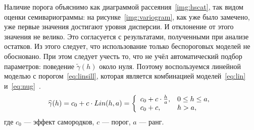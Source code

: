 Наличие порога объяснимо как диаграммой рассеяния~\ref{img:hscat}, так видом оценки семивариограммы: на рисунке~\ref{img:variogram}, как уже было замечено, уже первые значения достигают уровня дисперсии. И отклонение от этого значения не велико. Это согласуется с результатами, полученными при анализе остатков. Из этого следует, что использование только беспороговых моделей не обосновано. При этом следует учесть то, что не учёл автоматический подбор параметров: поведение $ \tilde{\gamma}(h) $ около нуля. Поэтому воспользуемся линейной моделью с порогом~\eqref{eq:linsill}, которая является комбинацией моделей~\eqref{eq:lin} и~\eqref{eq:nug}~\cite{pebesma2001gstat}.
\begin{equation}
\label{eq:linsill}
	\widehat{\gamma}(h) = c_0 + c \cdot Lin(h, a) = \left\{
 \begin{array}{l l}
   c_0 + c \cdot \frac{h}{a}, & 0 \leq h \leq a, \\
   c_0 + c, & h > a,
 \end{array} \right.
\end{equation}
где $ c_0 $ --- эффект самородков, $ c $ --- порог, $ a $ --- ранг.

